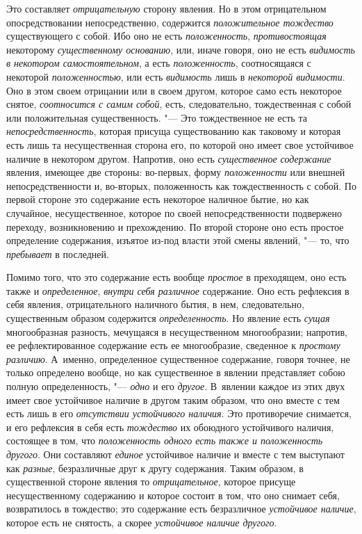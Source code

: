 Это составляет {\em отрицательную} сторону явления. Но в
этом отрицательном опосредствовании непосредственно, содержится
{\em положительное тождество} существующего с собой.
Ибо оно не есть {\em положенность},
{\em противостоящая} некоторому
{\em существенному основанию}, или, иначе говоря, оно
не есть {\em видимость в некотором самостоятельном}, а
есть {\em положенность}, соотносящаяся с некоторой
{\em положенностью}, или есть
{\em видимость} лишь в
{\em некоторой видимости}. Оно в этом своем отрицании
или в своем другом, которое само есть некоторое снятое,
{\em соотносится с самим собой}, есть, следовательно,
тождественная с собой или положительная существенность. "--- Это тождественное
не есть та {\em непосредственность}, которая присуща
существованию как таковому и которая есть лишь та несущественная сторона
его, по которой оно имеет свое устойчивое наличие в некотором другом.
Напротив, оно есть {\em существенное содержание}
явления, имеющее две стороны: во-первых, форму
{\em положенности} или внешней непосредственности и,
во-вторых, положенность как тождественность с собой. По первой стороне это
содержание есть некоторое наличное бытие, но как случайное, несущественное,
которое по своей непосредственности подвержено переходу, возникновению и
прехождению. По второй стороне оно есть простое определение содержания,
изъятое из-под власти этой смены явлений, "--- то, что
{\em пребывает} в последней.

Помимо того, что это содержание есть вообще
{\em простое} в преходящем, оно есть также и {\em определенное}, {\em внутри
себя различное }содержание. Оно есть рефлексия в себя явления,
отрицательного наличного бытия, в нем, следовательно, существенным образом
содержится {\em определенность}. Но явление есть
{\em сущая} многообразная разность, мечущаяся в
несущественном многообразии; напротив, ее рефлектированное содержание есть
ее многообразие, сведенное к {\em простому различию}.
А~именно, определенное существенное содержание, говоря точнее, не только
определено вообще, но как существенное в явлении представляет собою полную
определенность, "--- {\em одно} и его
{\em другое}. В~явлении каждое из этих двух имеет свое
устойчивое наличие в другом таким образом, что оно вместе с тем есть лишь в
его {\em отсутствии устойчивого наличия}. Это
противоречие снимается, и его рефлексия в себя есть
{\em тождество} их обоюдного устойчивого наличия,
состоящее в том, что {\em положенность одного есть
также и положенность другого}. Они составляют
{\em единое} устойчивое наличие и вместе с тем
выступают как {\em разные}, безразличные друг к другу
содержания. Таким образом, в существенной стороне явления то
{\em отрицательное}, которое присуще несущественному
содержанию и которое состоит в том, что оно снимает себя, возвратилось в
тождество; это содержание есть безразличное
{\em устойчивое наличие}, которое есть не снятость, а
скорее {\em устойчивое наличие другого}.


